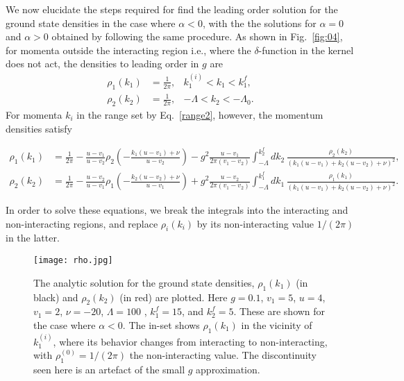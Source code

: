 \documentclass[aps,pra,
superscriptaddress,
reprint,twocolumn,preprintnumbers,
amsmath,amssymb,
nofootinbib]{revtex4-1}
\begin{document}
We now elucidate the steps required for find the leading order solution for the ground state densities in the case where $\alpha<0$, with the the solutions for $\alpha = 0$ and $\alpha>0$ obtained by following the same procedure. As shown in Fig.~\ref{fig:04}, for momenta outside the interacting region i.e., where the $\delta$-function in the kernel does not act, the densities to leading order in $g$ are
        \begin{align}
        \label{rhononint}
        \rho_1(k_1) &= \frac{1}{2\pi}, &k_1^{(i)}<k_1<k_1^f ,\nonumber \\
        \rho_2(k_2) &= \frac{1}{2\pi}, &-\Lambda<k_2<-\Lambda_0.
        \end{align}
For momenta $k_i$ in the range set by Eq.~\eqref{range2}, however, the momentum densities satisfy
        \begin{widetext}
        \begin{align}
        	\rho_1(k_1) &= \frac{1}{2\pi} - \frac{u - v_1}{u - v_2} \rho_2\left(-\frac{k_1(u - v_1) + \nu}{u - v_2}\right) - g^2\frac{u - v_1}{2\pi (v_1 - v_2)} \int_{-\Lambda}^{k_2^f} dk_2\,\frac{\rho_2(k_2)}{(k_1(u-v_1) + k_2(u - v_2) + \nu)^2}, \nonumber \\
        	\rho_2(k_2) &= \frac{1}{2\pi} - \frac{u - v_2}{u - v_1} \rho_1\left(-\frac{k_2(u - v_2) + \nu}{u - v_1} \right) + g^2\frac{u - v_2}{2\pi (v_1 - v_2)} \int_{-\Lambda}^{k_1^f} dk_1\,\frac{\rho_1(k_1)}{(k_1(u-v_1) + k_2(u - v_2) + \nu)^2}.
        \end{align}
        \end{widetext}
In order to solve these equations, we break the integrals into the interacting and non-interacting regions, and replace $\rho_i(k_i)$ by its non-interacting value $1/(2\pi)$ in the latter.
 	\begin{figure}[t]
    \texttt{[image: rho.jpg]}
    \centering
    \caption{\label{fig:05} The analytic solution for the ground state densities, $\rho_1(k_1)$ (in black) and $\rho_2(k_2)$ (in red) are plotted. Here $g = 0.1$, $v_1= 5$, $u = 4$, $v_1 = 2$, $\nu = - 20$, $\Lambda = 100$ , $k_1^f = 15$, and $k_2^f = 5$. These are shown for the case where $\alpha < 0$. The in-set shows $\rho_1(k_1)$ in the vicinity of $k_1^{(i)}$, where its behavior changes from interacting to non-interacting, with $\rho_1^{(0)} = 1/(2\pi)$ the non-interacting value. The discontinuity seen here is an artefact of the small $g$ approximation.}
    \end{figure}
    
\end{document}
